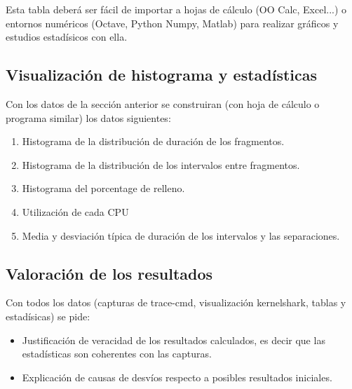\documentclass[a4paper,11pt,spanish,twoside]{article}
\begin{document}
Esta tabla deberá ser fácil de importar a hojas de cálculo (OO Calc,
Excel...) o entornos numéricos (Octave, Python Numpy, Matlab) para
realizar gráficos y estudios estadísicos con ella.

\subsection{Visualización de histograma y estadísticas}
\label{sec:estadistica}

Con los datos de la sección anterior se construiran (con hoja de
cálculo o programa similar) los datos siguientes:

\begin{enumerate}
\item Histograma de la distribución de duración de los fragmentos.
\item Histograma de la distribución de los intervalos entre
  fragmentos.
\item Histograma del porcentage de relleno.
\item Utilización de cada CPU
\item Media y desviación típica de duración de los intervalos y las
  separaciones.

\end{enumerate}

\subsection{Valoración de los resultados}
\label{sec:valoracion}

Con todos los datos (capturas de trace-cmd, visualización kernelshark,
tablas y estadísicas) se pide:

\begin{itemize}
\item Justificación de veracidad de los resultados calculados, es
  decir que las estadísticas son coherentes con las capturas.

\item Explicación de causas de desvíos respecto a posibles resultados
  iniciales.
\end{itemize}

% 
% 
\end{document}
